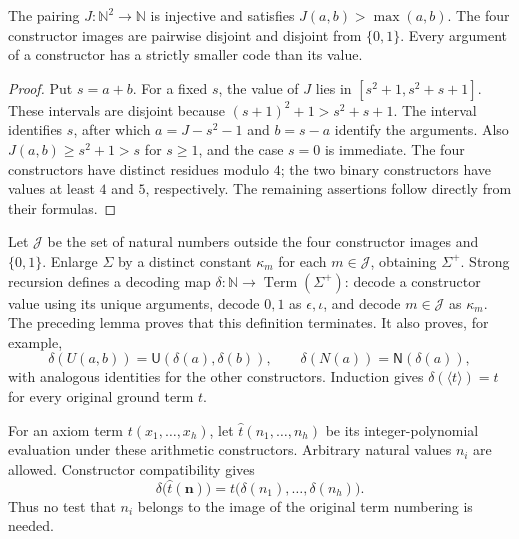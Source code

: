 \begin{auxsyntaxlem}
The pairing $J:\mathbb N^2\to\mathbb N$ is injective and satisfies
$J(a,b)>\max(a,b)$.  The four constructor images are pairwise disjoint
and disjoint from $\{0,1\}$.  Every argument of a constructor has a
strictly smaller code than its value.
\end{auxsyntaxlem}
\begin{proof}
Put $s=a+b$.  For a fixed $s$, the value of $J$ lies in
$[s^2+1,s^2+s+1]$.  These intervals are disjoint because
$(s+1)^2+1>s^2+s+1$.  The interval identifies $s$, after which
$a=J-s^2-1$ and $b=s-a$ identify the arguments.  Also
$J(a,b)\ge s^2+1>s$ for $s\ge1$, and the case $s=0$ is immediate.
The four constructors have distinct residues modulo $4$; the two binary
constructors have values at least $4$ and $5$, respectively.  The
remaining assertions follow directly from their formulas.
\end{proof}

Let $\mathcal J$ be the set of natural numbers outside the four
constructor images and $\{0,1\}$.  Enlarge $\Sigma$ by a distinct constant
$\kappa_m$ for each $m\in\mathcal J$, obtaining $\Sigma^+$.  Strong
recursion defines a decoding map
$\delta:\mathbb N\to\operatorname{Term}(\Sigma^+)$: decode a constructor
value using its unique arguments, decode $0,1$ as $\epsilon,\iota$, and
decode $m\in\mathcal J$ as $\kappa_m$.  The preceding lemma proves that
this definition terminates.  It also proves, for example,
\[
 \delta(U(a,b))=\mathsf U(\delta(a),\delta(b)),
 \qquad \delta(N(a))=\mathsf N(\delta(a)),
\]
with analogous identities for the other constructors.  Induction gives
$\delta(\langle t\rangle)=t$ for every original ground term $t$.

For an axiom term $t(x_1,\ldots,x_h)$, let
$\widehat t(n_1,\ldots,n_h)$ be its integer-polynomial evaluation under
these arithmetic constructors.  Arbitrary natural values $n_i$ are
allowed.  Constructor compatibility gives
\[
 \delta\bigl(\widehat t(\boldsymbol n)\bigr)
   =t\bigl(\delta(n_1),\ldots,\delta(n_h)\bigr).
\]
Thus no test that $n_i$ belongs to the image of the original term
numbering is needed.


